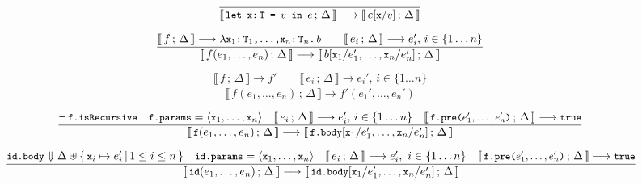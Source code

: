 \documentclass[a4paper,twoside]{article}
\newcommand{\lb}[2]{\llbracket\, #1\,;\, #2\, \rrbracket}
\newcommand{\TODO}[1]{\textcolor{YellowOrange}{(TODO: #1)}} %
\newcommand{\stt}[1]{\texttt{\small{#1}}}
\begin{document}
\begin{landscape}
\begin{figure}[htb]\ContinuedFloat
\centering
\begin{framed}

\begin{equation}
\dfrac{
}{
  \lb{\stt{let x:\,T = $v$ in $e$}}{\Delta} \longrightarrow
  \lb{e[\stt{x}/\stt{$v$}]}{\Delta}
}
\end{equation}


\begin{equation}
\dfrac{
  \lb{f}{\Delta} \longrightarrow \lambda \stt{x$_1$:\,T$_1$,\ldots,x$_n$:\,T$_n$.\,$b$}
  \qquad
  \lb{e_i}{\Delta} \longrightarrow e_i',\, i \in \{1 \ldots n\}
}{
  \lb{f(e_1,\ldots,e_n)}{\Delta} \longrightarrow
  \lb{b[\stt{x}_1/e_1',\ldots,\stt{x}_n/e_n']}{\Delta}
}
\end{equation}

\begin{equation}
\dfrac{
  \lb{f}{\Delta} \longrightarrow f' \qquad
  \lb{e_i}{\Delta} \longrightarrow e_i',\, i \in \{1 \ldots n\}
}{
  \lb{f(e_1,\ldots,e_n)}{\Delta} \longrightarrow
  f'(e_1', \ldots, e_n')
}
\end{equation}

\begin{equation}
\dfrac{
 \neg\,\stt{f.isRecursive} \quad
 \stt{f.params} = \langle \stt{x}_1, \ldots, \stt{x}_n \rangle \quad
 \lb{e_i}{\Delta} \longrightarrow e_i',\, i \in \{1 \ldots n\} \quad
 \lb{\stt{f.pre($e_1',\ldots,e_n'$)}}{\Delta} \longrightarrow \stt{true}
}{
  \lb{\stt{f}(e_1,\ldots,e_n)}{\Delta} \longrightarrow
  \lb{\stt{f.body}[\stt{x}_1/e_1',\ldots,\stt{x}_n/e_n']}{\Delta}
}
\label{fig:symbolicsem:fi1}
\end{equation}

\begin{equation}
\dfrac{
 \stt{id.body} \Downarrow \Delta \uplus \{\,\stt{x}_i \mapsto e_i'\,|\, 1 \leq i \leq n\,\}
 \quad
 \stt{id.params} = \langle \stt{x}_1, \ldots, \stt{x}_n \rangle
 \quad
 \lb{e_i}{\Delta} \longrightarrow e_i',\  i \in \{1 \ldots n\}
 \quad
 \lb{\stt{f.pre($e_1',\ldots,e_n'$)}}{\Delta} \longrightarrow \stt{true}
}{
  \lb{\stt{id}(e_1,\ldots,e_n)}{\Delta} \longrightarrow
  \lb{\stt{id.body}[\stt{x}_1/e_1',\ldots,\stt{x}_n/e_n']}{\Delta}
}
\label{fig:symbolicsem:fi2}
\end{equation}


\end{framed}
\end{figure}
\end{landscape}
\end{document}
